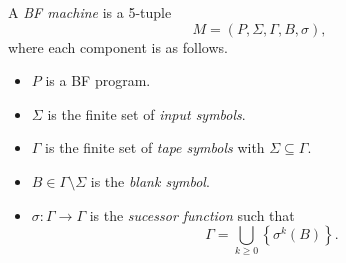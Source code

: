 \begin{definition}
  A \emph{BF machine} is a 5-tuple
  \begin{equation*}
    M = (P, \Sigma, \Gamma, B, \sigma),
  \end{equation*}
  where each component is as follows.
  \begin{itemize}
    \item $P$ is a BF program.
    \item $\Sigma$ is the finite set of \emph{input symbols}.
    \item $\Gamma$ is the finite set of \emph{tape symbols} with
    $\Sigma \subseteq \Gamma$.
    \item $B \in \Gamma \setminus \Sigma$ is the \emph{blank symbol}.
    \item $\sigma: \Gamma \to \Gamma$ is the \emph{sucessor function} such
    that
    \begin{equation*}
      \Gamma = \bigcup_{k \geq 0} \left\{\sigma^k(B)\right\}.
    \end{equation*}
  \end{itemize}
\end{definition}
